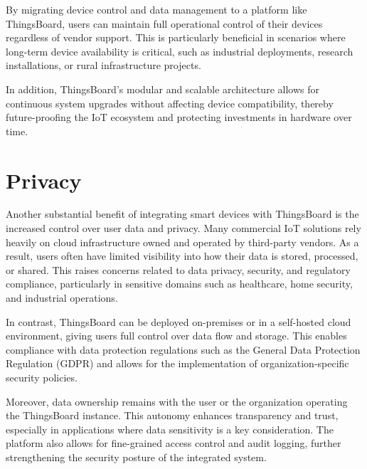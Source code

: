 By migrating device control and data management to a platform like ThingsBoard, users can maintain full operational control of their devices regardless of vendor support. This is particularly beneficial in scenarios where long-term device availability is critical, such as industrial deployments, research installations, or rural infrastructure projects.

In addition, ThingsBoard's modular and scalable architecture allows for continuous system upgrades without affecting device compatibility, thereby future-proofing the IoT ecosystem and protecting investments in hardware over time.

\section{Privacy}

Another substantial benefit of integrating smart devices with ThingsBoard is the increased control over user data and privacy. Many commercial IoT solutions rely heavily on cloud infrastructure owned and operated by third-party vendors. As a result, users often have limited visibility into how their data is stored, processed, or shared. This raises concerns related to data privacy, security, and regulatory compliance, particularly in sensitive domains such as healthcare, home security, and industrial operations.

In contrast, ThingsBoard can be deployed on-premises or in a self-hosted cloud environment, giving users full control over data flow and storage. This enables compliance with data protection regulations such as the General Data Protection Regulation (GDPR) and allows for the implementation of organization-specific security policies.

Moreover, data ownership remains with the user or the organization operating the ThingsBoard instance. This autonomy enhances transparency and trust, especially in applications where data sensitivity is a key consideration. The platform also allows for fine-grained access control and audit logging, further strengthening the security posture of the integrated system.
